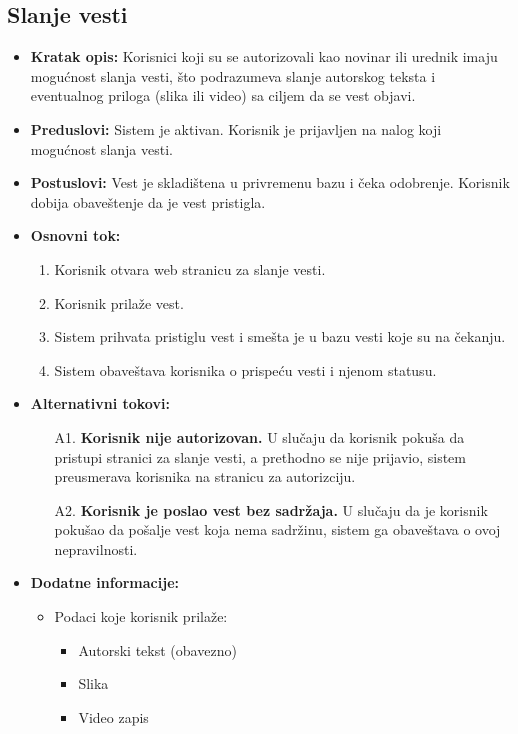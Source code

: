 \documentclass{article}
\begin{document}
\newpage

\subsection{Slanje vesti}
\begin{itemize}
    \item \textbf{Kratak opis:} Korisnici koji su se autorizovali kao novinar ili urednik imaju mogućnost slanja vesti, što podrazumeva slanje autorskog teksta i eventualnog priloga (slika ili video) sa ciljem da se vest objavi. 
    \item \textbf{Preduslovi:} Sistem je aktivan. Korisnik je prijavljen na nalog koji mogućnost slanja vesti.  
    \item \textbf{Postuslovi:} Vest je skladištena u privremenu bazu i čeka odobrenje. Korisnik dobija obaveštenje da je vest pristigla.
    \item \textbf{Osnovni tok:}
        \begin{enumerate}
            \item Korisnik otvara web stranicu za slanje vesti.
            \item Korisnik prilaže vest.
            \item Sistem prihvata pristiglu vest i smešta je u bazu vesti koje su na čekanju.
            \item Sistem obaveštava korisnika o prispeću vesti i njenom statusu.
	    \end{enumerate}
    \item \textbf{Alternativni tokovi:}
        \begin{itemize}
            \item[A1.] \textbf{Korisnik nije autorizovan.} U slučaju da korisnik pokuša da pristupi stranici za slanje vesti, a prethodno se nije prijavio, sistem preusmerava korisnika na stranicu za autorizciju.
            \item[A2.] \textbf{Korisnik je poslao vest bez sadržaja.} U slučaju da je korisnik pokušao da pošalje vest koja nema sadržinu, sistem ga obaveštava o ovoj nepravilnosti.
        \end{itemize}
    \item \textbf{Dodatne informacije:}
        \begin{itemize}
            \item  Podaci koje korisnik prilaže:
                \begin{itemize}
                    \item Autorski tekst (obavezno)
                    \item Slika
                    \item Video zapis
                \end{itemize}
        \end{itemize}
\end{itemize}
\end{document}
